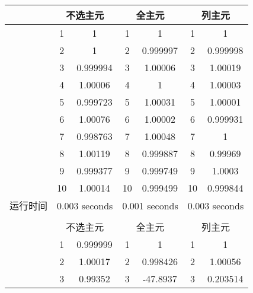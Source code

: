\documentclass{article}
\begin{document}
\begin{table}[H]
	\centering
	\begin{tabular}{ccccccc}
		\toprule
		& \multicolumn{2}{c}{\textbf{不选主元}} & \multicolumn{2}{c}{\textbf{全主元}}  & \multicolumn{2}{c}{\textbf{列主元}}  \\
		\midrule
		& 1            & 1                  & 1             & 1                 & 1             & 1                 \\
		& 2            & 1                  & 2             & 0.999997          & 2             & 0.999998          \\
		& 3            & 0.999994           & 3             & 1.00006           & 3             & 1.00019           \\
		& 4            & 1.00006            & 4             & 1                 & 4             & 1.00003           \\
		& 5            & 0.999723           & 5             & 1.00031           & 5             & 1.00001           \\
		& 6            & 1.00076            & 6             & 1.00002           & 6             & 0.999931          \\
		& 7            & 0.998763           & 7             & 1.00048           & 7             & 1                 \\
		& 8            & 1.00119            & 8             & 0.999887          & 8             & 0.99969           \\
		& 9            & 0.999377           & 9             & 0.999749          & 9             & 1.0003            \\
		& 10           & 1.00014            & 10            & 0.999499          & 10            & 0.999844          \\
		运行时间 & \multicolumn{2}{c}{0.003 seconds} & \multicolumn{2}{c}{0.001 seconds} & \multicolumn{2}{c}{0.003 seconds}\\
		\midrule
		&&&&&&\\
		\toprule
		& \multicolumn{2}{c}{不选主元}          & \multicolumn{2}{c}{全主元}           & \multicolumn{2}{c}{列主元}           \\
		\midrule
		& 1            & 0.999999           & 1            & 1                  & 1            & 1                  \\
		& 2            & 1.00017            & 2            & 0.998426           & 2            & 1.00056            \\
		& 3            & 0.99352            & 3            & -47.8937           & 3            & 0.203514           \\

\end{tabular}
\end{table}
\end{document}
